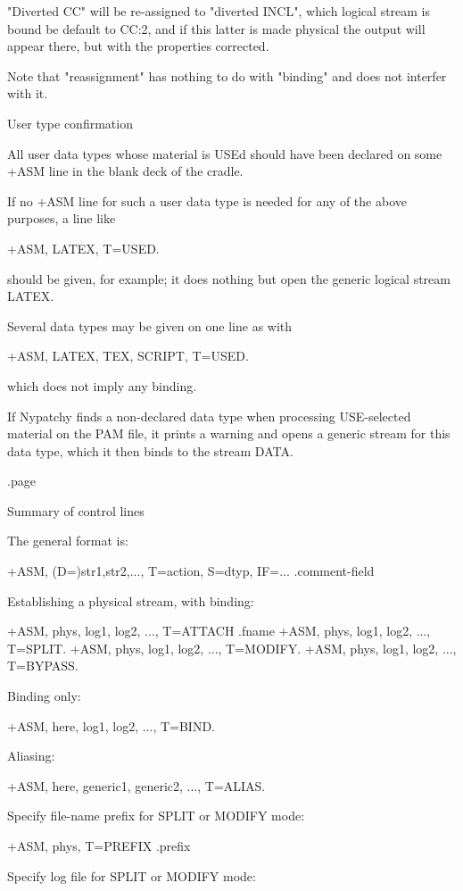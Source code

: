 "Diverted CC" will be re-assigned to "diverted INCL", which logical
stream is bound be default to CC:2, and if this latter is made
physical the output will appear there, but with the properties
corrected.

Note that "reassignment" has nothing to do with "binding" and does
not interfer with it.


\item
User type confirmation

All user data types whose material is USEd should have been declared on
some +ASM line in the blank deck of the cradle.

If no +ASM line for such a user data type is needed for any of the above
purposes, a line like

      +ASM, LATEX, T=USED.

should be given, for example; it does nothing but open the generic logical
stream LATEX.

Several data types may be given on one line as with

      +ASM, LATEX, TEX, SCRIPT, T=USED.

which does not imply any binding.

If Nypatchy finds a non-declared data type when processing USE-selected
material on the PAM file, it prints a warning and opens a generic stream
for this data type, which it then binds to the stream DATA.

.page
\item
Summary of control lines

   The general format is:

     +ASM, (D=)str1,str2,..., T=action, S=dtyp, IF=...   .comment-field

   Establishing a physical stream, with binding:

         +ASM, phys, log1, log2, ..., T=ATTACH   .fname
         +ASM, phys, log1, log2, ..., T=SPLIT.
         +ASM, phys, log1, log2, ..., T=MODIFY.
         +ASM, phys, log1, log2, ..., T=BYPASS.

   Binding only:

         +ASM, here, log1, log2, ..., T=BIND.

   Aliasing:

         +ASM, here, generic1, generic2, ..., T=ALIAS.

   Specify file-name prefix for SPLIT or MODIFY mode:

         +ASM, phys, T=PREFIX   .prefix

   Specify log file for SPLIT or MODIFY mode:

